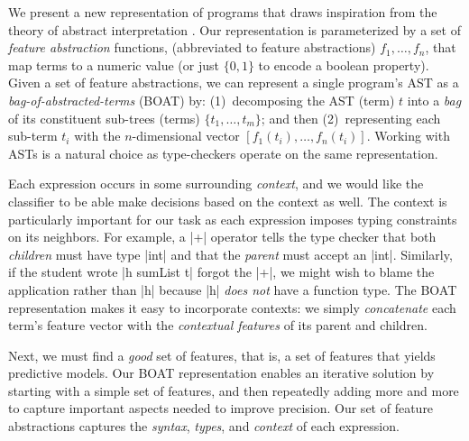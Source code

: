 %
We present a new representation of programs
that draws inspiration from the theory of
abstract interpretation \citep{Cousot1977-xs}.
%
Our representation is parameterized by a
set of \emph{feature abstraction} functions,
(abbreviated to feature abstractions)
$f_1, \ldots, f_n$, that map terms to a
numeric value (or just $\{0, 1\}$ to
encode a boolean property).
%
Given a set of feature abstractions, we
can represent a single program's AST as
a \emph{bag-of-abstracted-terms} (BOAT)
by:
%
(1)~decomposing the AST (term) $t$ into
    a \emph{bag} of its constituent sub-trees
    (terms) $\{t_1,\ldots,t_m\}$; and then
%
(2)~representing each sub-term $t_i$
    with the $n$-dimensional
    vector $[f_1(t_i),\ldots, f_n(t_i)]$.
%
Working with ASTs is a natural choice
as type-checkers operate on the same representation.



%
Each expression occurs in some surrounding
\emph{context}, and we would like the
classifier to be able make decisions based
on the context as well.
%
The context is particularly important
for our task as each expression
imposes typing constraints on its
neighbors.
%
For example, a |+| operator tells
the type checker that both \emph{children}
must have type |int| and that the \emph{parent}
must accept an |int|.
%
Similarly, if the student wrote
|h sumList t| \ie forgot the |+|,
we might wish to blame the application
rather than |h| because |h|
\emph{does not} have a function type.
%
The BOAT representation makes it
easy to incorporate contexts: we
simply \emph{concatenate} each
term's feature vector with the
\emph{contextual features} of
its parent and children.




Next, we must find a \emph{good}
set of features, that is, a set
of features that yields predictive
models. Our BOAT representation
enables an iterative solution
by starting with
a simple set of features, and
then repeatedly adding more
and more to capture important
aspects needed to improve precision.
%
Our set of feature abstractions
captures the
\emph{syntax}, \emph{types}, and
\emph{context} of each expression.

